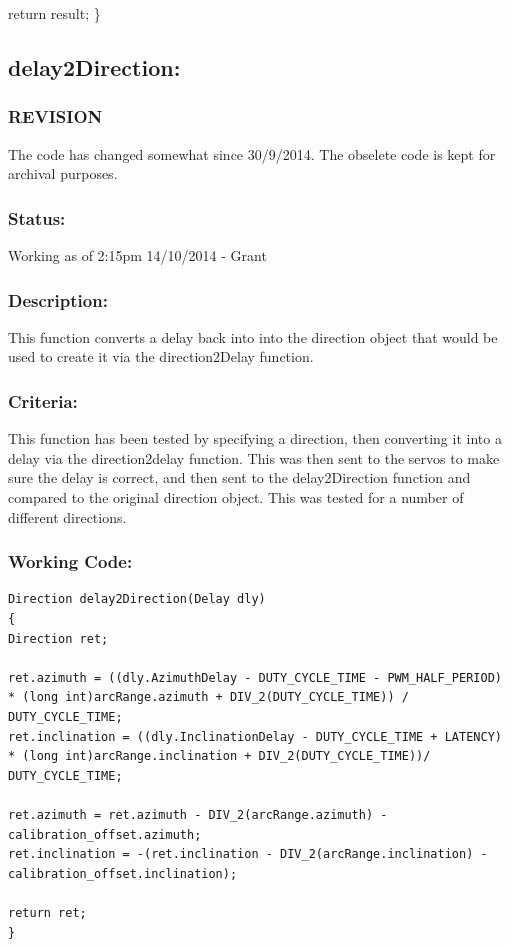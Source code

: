 \documentclass[]{report}
\begin{document}
	return result;\newline
\}\newline

\subsection{delay2Direction:}
\subsubsection{REVISION}
The code has changed somewhat since 30/9/2014. The obselete code is kept for archival purposes.

\subsubsection{Status:}
Working as of 2:15pm 14/10/2014 - Grant

\subsubsection{Description:}
This function converts a delay back into into the direction object that would be used to create it via the direction2Delay function.

\subsubsection{Criteria:}
This function has been tested by specifying a direction, then converting it into a delay via the direction2delay function. This was then sent to the servos to make sure the delay is correct, and then sent to the delay2Direction function and compared to the original direction object. This was tested for a number of different directions.

\subsubsection{Working Code:}
\begin{lstlisting}
Direction delay2Direction(Delay dly)
{
Direction ret;

ret.azimuth = ((dly.AzimuthDelay - DUTY_CYCLE_TIME - PWM_HALF_PERIOD) * (long int)arcRange.azimuth + DIV_2(DUTY_CYCLE_TIME)) / DUTY_CYCLE_TIME;
ret.inclination = ((dly.InclinationDelay - DUTY_CYCLE_TIME + LATENCY) * (long int)arcRange.inclination + DIV_2(DUTY_CYCLE_TIME))/ DUTY_CYCLE_TIME;

ret.azimuth = ret.azimuth - DIV_2(arcRange.azimuth) - calibration_offset.azimuth;
ret.inclination = -(ret.inclination - DIV_2(arcRange.inclination) - calibration_offset.inclination);

return ret;
}
\end{lstlisting}
\end{document}
